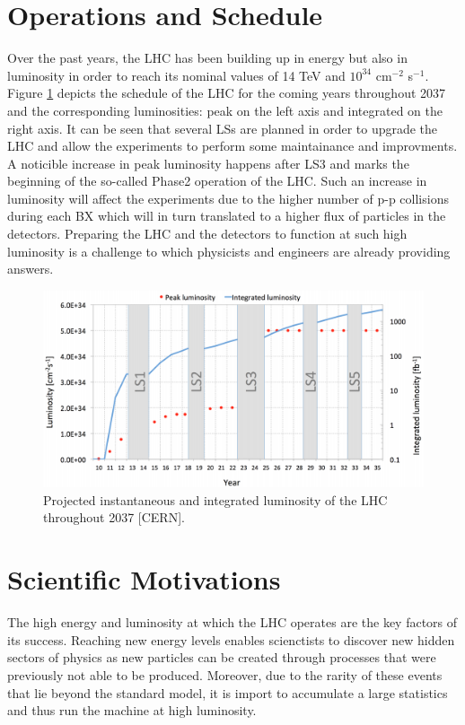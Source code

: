 	\section{Operations and Schedule}

    Over the past years, the LHC has been building up in energy but also in luminosity in order to reach its nominal values of 14 TeV and $ 10^{34} $ cm$^{-2}$ s$^{-1}$. Figure \ref{fig:I-2-luminosity} depicts the schedule of the LHC for the coming years throughout 2037 and the corresponding luminosities: peak on the left axis and integrated on the right axis. It can be seen that several LSs are planned in order to upgrade the LHC and allow the experiments to perform some maintainance and improvments. A noticible increase in peak luminosity happens after LS3 and marks the beginning of the so-called Phase2 operation of the LHC. Such an increase in luminosity will affect the experiments due to the higher number of p-p collisions during each BX which will in turn translated to a higher flux of particles in the detectors. Preparing the LHC and the detectors to function at such high luminosity is a challenge to which physicists and engineers are already providing answers.

    \begin{figure}[h!]
      \centering
      \includegraphics[width=\textwidth]{img/I-2-LHC/lhc-schedule.png}
      \caption{Projected instantaneous and integrated luminosity of the LHC throughout 2037 [CERN].}
      \label{fig:I-2-luminosity}
    \end{figure}

  \section{Scientific Motivations}

    The high energy and luminosity at which the LHC operates are the key factors of its success. Reaching new energy levels enables scienctists to discover new hidden sectors of physics as new particles can be created through processes that were previously not able to be produced. Moreover, due to the rarity of these events that lie beyond the standard model, it is import to accumulate a large statistics and thus run the machine at high luminosity. \\


